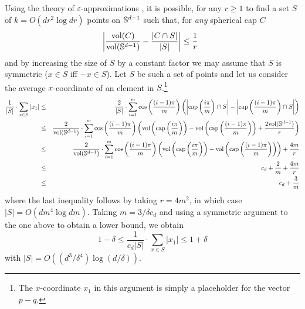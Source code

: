 \documentclass[charterfonts,lotsofwhite]{patmorin}
\newcommand{\eps}{\varepsilon}
\begin{document}
Using the theory of $\eps$-approximations \cite[Chapter~4]{c00}, it is
possible, for any $r\ge 1$ to find a set $S$ of $k=O(dr^2\log dr)$
points on $\mathbb{S}^{d-1}$ such that, for \emph{any} spherical cap $C$
\[
    \left|\frac{\mathrm{vol}(C)}{\mathrm{vol}(\mathbb{S}^{d-1})} - \frac{|C\cap S|}{|S|} \right| 
              \le \frac{1}{r}  \enspace 
\]
and by increasing the size of $S$ by a constant factor we may assume
that $S$ is symmetric ($x\in S$ iff $-x\in S$).
Let $S$ be such a set of points and let us consider the average
$x$-coordinate of an element in $S$.\footnote{The $x$-coordinate $x_1$
in this argument is simply a placeholder for the vector $p-q$.}
\begin{eqnarray*}
\frac{1}{|S|}\cdot \sum_{x\in S} |x_1|
  \comment{ & = & \frac{2}{|S|}\cdot\sum_{i=1}^m
          \sum\left\{x_1: x\in
              S\cap\ccap\left(\frac{i\pi}{m}\right) 
                \setminus\ccap\left(\frac{(i-1)\pi}{m}\right)
          \right\} \\ }
  & \le & \frac{2}{|S|}\cdot
         \sum_{i=1}^m\cos\left(\frac{(i-1)\pi}{m}\right)
           \left(
             \left|\ccap\left(\frac{i\pi}{m}\right)\cap S\right| -
             \left|\ccap\left(\frac{(i-1)\pi}{m}\right)\cap S\right|
           \right) \\
  & \le & \frac{2}{\area(\Sd)}\cdot
         \sum_{i=1}^m\cos\left(\frac{(i-1)\pi}{m}\right)
           \left(
             \area\left(\ccap\left(\frac{i\pi}{m}\right)\right) -
             \area\left(\ccap\left(\frac{(i-1)\pi}{m}\right)\right) +
             \frac{2\area(\Sd)}{r}
           \right) \\
  & \le & \frac{2}{\area(\Sd)}\cdot
         \sum_{i=1}^m\cos\left(\frac{(i-1)\pi}{m}\right)
           \left(
             \area\left(\ccap\left(\frac{i\pi}{m}\right)\right) -
             \area\left(\ccap\left(\frac{(i-1)\pi}{m}\right)\right)
           \right) + \frac{4m}{r} \\
  & \le & c_d + \frac{2}{m} + \frac{4m}{r} \\
  & \le & c_d + \frac{3}{m} 
\end{eqnarray*}
where the last inequality follows by taking $r=4m^2$, in which case
$|S|=O(dm^4\log dm)$.  Taking $m=3/\delta c_d$ and using a symmetric
argument to the one above to obtain a lower bound, we obtain
\[
  1-\delta \le \frac{1}{c_d|S|}\cdot\sum_{x\in S}|x_1| \le 1 + \delta
\]
with $|S|=O((d^3/\delta^4)\log(d/\delta))$.  
\end{document}
